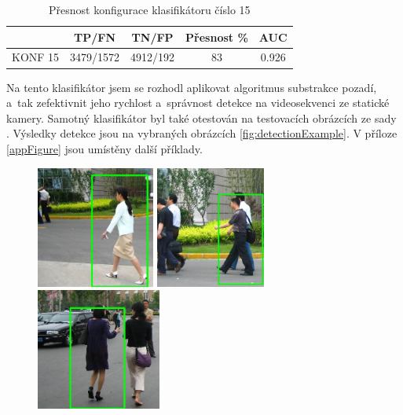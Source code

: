 \begin{table}[H]
\centering
\caption{Přesnost konfigurace klasifikátoru číslo 15}
\begin{tabular} { |c|c|c|c|c| }
\hline
{}          & {TP/FN} 	 & {TN/FP} 	& {Přesnost \%} & {AUC}  \\ \hline
KONF 15 	  &  3479/1572  & 4912/192    &     83 		 & 0.926  \\ \hline
\end{tabular} 
\label{classTab2}
\end{table}
Na tento klasifikátor jsem se rozhodl aplikovat algoritmus substrakce pozadí, a~tak zefektivnit jeho rychlost a~správnost detekce na videosekvenci ze statické kamery.  Samotný klasifikátor byl také otestován na testovacích obrázcích ze sady \cite{testimg}. Výsledky detekce jsou na vybraných obrázcích \ref{fig:detectionExample}. V příloze \ref{appFigure} jsou umístěny další příklady.
\begin{figure}[H]
\centering
\includegraphics[keepaspectratio, max height=4cm,]{figures/ped/d1}%
\hfill %
\includegraphics[keepaspectratio, max height=4cm,]{figures/ped/d2}%
\hfill %
\includegraphics[keepaspectratio, max height=4cm,]{figures/ped/d3}%
\label{detectionExample2}
\end{figure}
